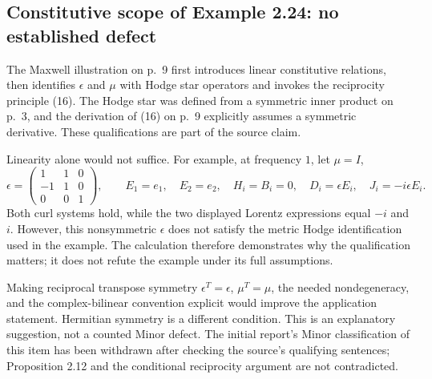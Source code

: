 \documentclass[10pt]{article}
\begin{document}
\subsection*{Constitutive scope of Example 2.24: no established defect}
The Maxwell illustration on p. 9 first introduces linear constitutive relations, then identifies \(\epsilon\) and \(\mu\) with Hodge star operators and invokes the reciprocity principle (16). The Hodge star was defined from a symmetric inner product on p. 3, and the derivation of (16) on p. 9 explicitly assumes a symmetric derivative. These qualifications are part of the source claim.\par
Linearity alone would not suffice. For example, at frequency \(1\), let \(\mu=I\), \[\epsilon=\begin{pmatrix}1&1&0\\-1&1&0\\0&0&1\end{pmatrix},
 \qquad E_1=e_1,\quad E_2=e_2,\quad H_i=B_i=0,
 \quad D_i=\epsilon E_i,\quad J_i=-i\epsilon E_i.\] Both curl systems hold, while the two displayed Lorentz expressions equal \(-i\) and \(i\). However, this nonsymmetric \(\epsilon\) does not satisfy the metric Hodge identification used in the example. The calculation therefore demonstrates why the qualification matters; it does not refute the example under its full assumptions.\par
Making reciprocal transpose symmetry \(\epsilon^T=\epsilon\), \(\mu^T=\mu\), the needed nondegeneracy, and the complex-bilinear convention explicit would improve the application statement. Hermitian symmetry is a different condition. This is an explanatory suggestion, not a counted Minor defect. The initial report’s Minor classification of this item has been withdrawn after checking the source’s qualifying sentences; Proposition 2.12 and the conditional reciprocity argument are not contradicted.\par
\end{document}
